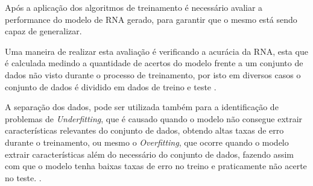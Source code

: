 \par Após a aplicação dos algoritmos de treinamento é necessário avaliar a performance do modelo de RNA gerado, para garantir que o mesmo está sendo capaz de generalizar.

\par Uma maneira de realizar esta avaliação é verificando a acurácia da RNA, esta que é calculada medindo a quantidade de acertos do modelo frente a um conjunto de dados não visto durante o processo de treinamento, por isto em diversos casos o conjunto de dados é dividido em dados de treino e teste \cite{Goodfellow-et-al-2016}.

\par A separação dos dados, pode ser utilizada também para a identificação de problemas de \textit{Underfitting}, que é causado quando o modelo não consegue extrair características relevantes do conjunto de dados, obtendo altas taxas de erro durante o treinamento, ou mesmo o \textit{Overfitting}, que ocorre quando o modelo extrair características além do necessário do conjunto de dados, fazendo assim com que o modelo tenha baixas taxas de erro no treino e praticamente não acerte no teste. \cite{Goodfellow-et-al-2016}.




